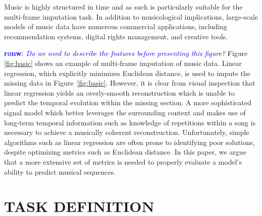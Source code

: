 \documentclass{article}
\newcommand{\FIXME}[2][FIXME]{\textcolor{blue}{\textbf{#1}: \emph{#2}}}
\begin{document}

Music is highly structured in time and as such is particularly suitable
for the multi-frame imputation task.
In addition to musicological implications,
large-scale models of music data have numerous commercial
applications, including recommendation systems, digital rights
management, and creative tools.  

\FIXME[ronw]{Do we need to describe the features before presenting
  this figure?}
Figure \ref{fig:basic} shows an example of multi-frame imputation of
music data.  Linear regression, which explicitly minimizes Euclidean
distance, is used to impute the missing data in
Figure~\ref{fig:basic}.  However, it is clear from visual inspection
that linear regression yields an overly-smooth reconstruction which is
unable to predict the temporal evolution within the missing section.
%
A more sophisticated signal model which better leverages the
surrounding context and makes use of long-term temporal information
such as knowledge of repetitions within a song is necessary to achieve
a musically coherent reconstruction.
%
Unfortunately, simple algorithms such as linear regression
are often prone to identifying poor solutions, despite optimizing
metrics such as Euclidean distance.
%
In this paper, we argue that a more extensive set of metrics is needed
to properly evaluate a model's ability to predict musical sequences.


\section{TASK DEFINITION}
\label{sec:task}
\end{document}

